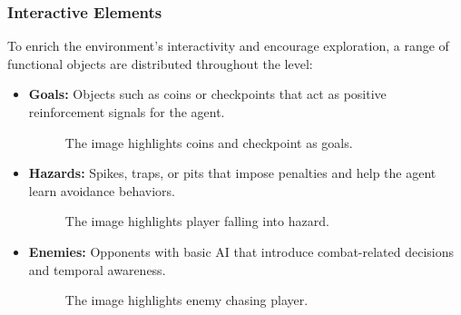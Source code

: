 \documentclass[12pt,oneside,openright,a4paper]{cpe-english-project}
\begin{document}
\subsubsection{Interactive Elements}
To enrich the environment's interactivity and encourage exploration, a range of functional objects are distributed throughout the level:
\begin{itemize}
\item  \textbf{Goals:} Objects such as coins or checkpoints that act as positive reinforcement signals for the agent.
\begin{figure}[H]
\centering
{}
\caption{The image highlights coins and checkpoint as goals.}\label{fig:Goals}
\end{figure}
\item  \textbf{Hazards:} Spikes, traps, or pits that impose penalties and help the agent learn avoidance behaviors.
\begin{figure}[H]
\centering
{}
\caption{The image highlights player falling into hazard.}\label{fig:Hazards}
\end{figure}
\item  \textbf{Enemies:} Opponents with basic AI that introduce combat-related decisions and temporal awareness.
\begin{figure}[H]
\centering
{}
\caption{The image highlights enemy chasing player.}\label{fig:EnemyPic}
\end{figure}
\end{itemize}
\end{document}
